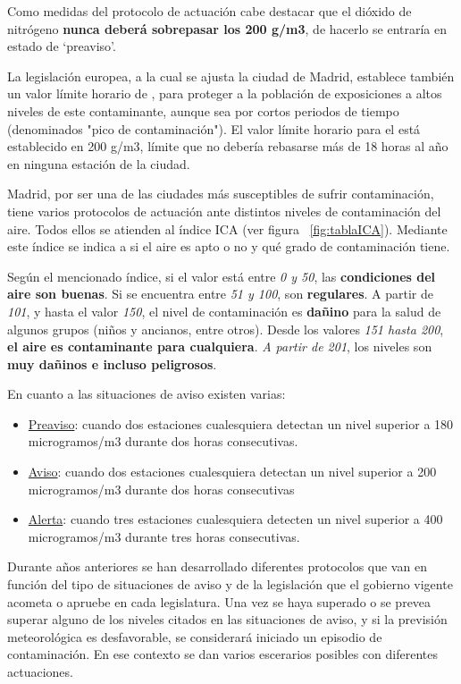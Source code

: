  Como medidas del protocolo de actuación cabe destacar que el dióxido de nitrógeno  \textbf{nunca deberá sobrepasar los 200 \textmugreek g/m3}, de hacerlo se entraría en estado de ‘preaviso’.
 
 La legislación europea, a la cual se ajusta la ciudad de Madrid, establece también un valor límite horario de , para proteger a la población de exposiciones a altos niveles de este contaminante, aunque sea por cortos periodos de tiempo (denominados "pico de contaminación"). El valor límite horario para el  está establecido en 200 \textmugreek g/m3, límite que no debería rebasarse más de 18 horas al año en ninguna estación de la ciudad.
 
    Madrid, por ser una de las ciudades más susceptibles de sufrir contaminación, tiene varios protocolos de actuación ante distintos niveles de contaminación del aire. Todos ellos se atienden al índice ICA (ver figura ~\ref{fig:tablaICA}). Mediante este índice se indica a si el aire es apto o no y qué grado de contaminación tiene. 
  
 Según el mencionado índice, si el valor está entre \textit{0 y 50}, las \textbf{condiciones del aire son buenas}. Si se encuentra entre \textit{51 y 100}, son \textbf{regulares}. A partir de \textit{101}, y hasta el valor \textit{150}, el nivel de contaminación es \textbf{dañino} para la salud de algunos grupos (niños y ancianos, entre otros). Desde los valores \textit{151 hasta 200}, \textbf{el aire es contaminante para cualquiera}. \textit{A partir de 201}, los niveles son \textbf{muy dañinos e incluso peligrosos}.

En cuanto a las  situaciones de aviso existen varias: 
\begin{itemize}
	\item \underline{Preaviso}: cuando dos estaciones cualesquiera detectan un nivel superior a 180 microgramos/m3 durante dos horas consecutivas.
	\item \underline{Aviso}: cuando dos estaciones cualesquiera detectan un nivel superior a 200 microgramos/m3 durante dos horas consecutivas
	\item \underline{Alerta}: cuando tres estaciones cualesquiera detecten un nivel superior a 400 microgramos/m3 durante tres horas consecutivas.
\end{itemize}

Durante años anteriores se han desarrollado diferentes protocolos que van en función del tipo de situaciones de aviso y de la legislación que el gobierno vigente acometa o apruebe en cada legislatura. Una vez se haya superado o se prevea superar alguno de los niveles citados en las situaciones de aviso, y si la previsión meteorológica es desfavorable, se considerará iniciado un episodio de contaminación. En ese contexto se dan varios escerarios posibles con diferentes actuaciones.


